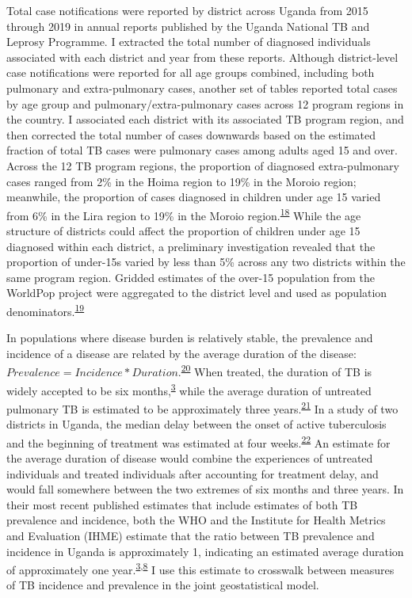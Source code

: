 \documentclass[
]{article}
\begin{document}
Total case notifications were reported by district across Uganda from 2015 through 2019 in annual reports published by the Uganda National TB and Leprosy Programme. I extracted the total number of diagnosed individuals associated with each district and year from these reports. Although district-level case notifications were reported for all age groups combined, including both pulmonary and extra-pulmonary cases, another set of tables reported total cases by age group and pulmonary/extra-pulmonary cases across 12 program regions in the country. I associated each district with its associated TB program region, and then corrected the total number of cases downwards based on the estimated fraction of total TB cases were pulmonary cases among adults aged 15 and over. Across the 12 TB program regions, the proportion of diagnosed extra-pulmonary cases ranged from 2\% in the Hoima region to 19\% in the Moroio region; meanwhile, the proportion of cases diagnosed in children under age 15 varied from 6\% in the Lira region to 19\% in the Moroio region.\textsuperscript{\protect\hyperlink{ref-UgandaNationalTuberculosisandLeprosyProgramme2018}{18}} While the age structure of districts could affect the proportion of children under age 15 diagnosed within each district, a preliminary investigation revealed that the proportion of under-15s varied by less than 5\% across any two districts within the same program region. Gridded estimates of the over-15 population from the WorldPop project were aggregated to the district level and used as population denominators.\textsuperscript{\protect\hyperlink{ref-Tatem2017}{19}}

In populations where disease burden is relatively stable, the prevalence and incidence of a disease are related by the average duration of the disease: \(Prevalence = Incidence * Duration\).\textsuperscript{\protect\hyperlink{ref-Freeman1980}{20}} When treated, the duration of TB is widely accepted to be six months,\textsuperscript{\protect\hyperlink{ref-WorldHealthOrganization2019}{3}} while the average duration of untreated pulmonary TB is estimated to be approximately three years.\textsuperscript{\protect\hyperlink{ref-Tiemersma2011}{21}} In a study of two districts in Uganda, the median delay between the onset of active tuberculosis and the beginning of treatment was estimated at four weeks.\textsuperscript{\protect\hyperlink{ref-Buregyeya2014}{22}} An estimate for the average duration of disease would combine the experiences of untreated individuals and treated individuals after accounting for treatment delay, and would fall somewhere between the two extremes of six months and three years. In their most recent published estimates that include estimates of both TB prevalence and incidence, both the WHO and the Institute for Health Metrics and Evaluation (IHME) estimate that the ratio between TB prevalence and incidence in Uganda is approximately 1, indicating an estimated average duration of approximately one year.\textsuperscript{\protect\hyperlink{ref-WorldHealthOrganization2019}{3},\protect\hyperlink{ref-Kyu2018}{8}} I use this estimate to crosswalk between measures of TB incidence and prevalence in the joint geostatistical model.
\end{document}
